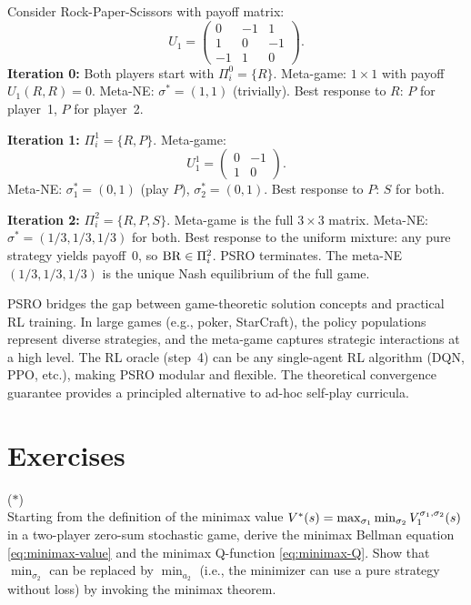 \documentclass[11pt,a4paper]{article}
\begin{document}
\begin{example}
\label{ex:psro-rps}
Consider Rock-Paper-Scissors with payoff matrix:
\[
  U_1 = \begin{pmatrix}
    0 & -1 & 1 \\
    1 & 0 & -1 \\
    -1 & 1 & 0
  \end{pmatrix}.
\]
\textbf{Iteration 0:} Both players start with $\Pi_i^0 = \{R\}$.
Meta-game: $1 \times 1$ with payoff $U_1(R,R) = 0$.  Meta-NE:
$\sigma^* = (1, 1)$ (trivially).  Best response to $R$: $P$ for
player~1, $P$ for player~2.

\textbf{Iteration 1:} $\Pi_i^1 = \{R, P\}$.  Meta-game:
\[
  U_1^1 = \begin{pmatrix} 0 & -1 \\ 1 & 0 \end{pmatrix}.
\]
Meta-NE: $\sigma_1^* = (0, 1)$ (play $P$), $\sigma_2^* = (0, 1)$.
Best response to $P$: $S$ for both.

\textbf{Iteration 2:} $\Pi_i^2 = \{R, P, S\}$.  Meta-game is the full
$3 \times 3$ matrix.  Meta-NE: $\sigma^* = (1/3, 1/3, 1/3)$ for both.
Best response to the uniform mixture: any pure strategy yields payoff~0,
so $\mathrm{BR} \in \Pi_i^2$.  PSRO terminates.  The meta-NE
$(1/3, 1/3, 1/3)$ is the unique Nash equilibrium of the full game.
\end{example}

\begin{rlconnection}
PSRO bridges the gap between game-theoretic solution concepts and
practical RL training.  In large games (e.g., poker, StarCraft), the
policy populations represent diverse strategies, and the meta-game
captures strategic interactions at a high level.  The RL oracle (step~4)
can be any single-agent RL algorithm (DQN, PPO, etc.), making PSRO
modular and flexible.  The theoretical convergence guarantee provides a
principled alternative to ad-hoc self-play curricula.
\end{rlconnection}


\section{Exercises}

\begin{exercise}
\textnormal{(\(*\))} \\
Starting from the definition of the minimax value
$V^*(s) = \max_{\sigma_1} \min_{\sigma_2} V_1^{\sigma_1, \sigma_2}(s)$
in a two-player zero-sum stochastic game, derive the minimax Bellman
equation \eqref{eq:minimax-value} and the minimax Q-function
\eqref{eq:minimax-Q}.  Show that $\min_{\sigma_2}$ can be replaced by
$\min_{a_2}$ (i.e., the minimizer can use a pure strategy without loss)
by invoking the minimax theorem.
\end{exercise}
\end{document}
